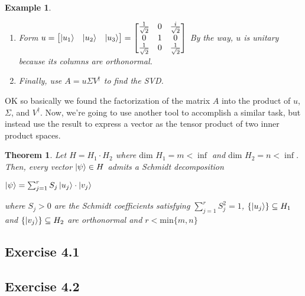 \documentclass[12pt]{article}
\theoremstyle{plain}
\newtheorem{theorem}[lemma]{Theorem}
\theoremstyle{nonumberplain}
\theoremstyle{plain}
\newtheorem{example}[lemma]{Example}
\theoremstyle{nonumberplain}
\newcommand\1{{\bf 1}}
\newcommand{\bmat}[1]{\begin{bmatrix*} #1 \end{bmatrix*}} %
\newcommand{\C}{\mathbb{C}} %
\newcommand{\<}{\left\langle}
\renewcommand{\>}{\right\rangle}
\begin{document}
\begin{example}
\begin{enumerate}
\begin{enumerate}
Ok now we have some wacky new vectors which form an orthonormal basis for $\C^3$.
\end{enumerate}
\item Form $u=\bmat{\ket{u_1} & \ket{u_2} & \ket{u_3}}=
\bmat{
\frac{1}{\sqrt{2}} & 0 & \frac{i}{\sqrt{2}} \\
0 & 1 & 0 \\
\frac{1}{\sqrt{2}} & 0 & \frac{1}{\sqrt{2}}}$ By the way, $u$ is unitary because its columns are orthonormal.
\item Finally, use $A=u\Sigma V^\dagger$ to find the SVD.
\end{enumerate}
\end{example}
OK so basically we found the factorization of the matrix $A$ into the product of $u$,$\Sigma$, and $V^\dagger$. Now, we're going to use another tool to accomplish a similar task, but instead use the result to express a vector as the tensor product of two inner product spaces.
\begin{theorem}
Let $H=H_1\cdot H_2$ where $\text{dim } H_1=m<\inf$ and $\text{dim } H_2=n<\inf$. Then, every vector $\ket{\psi}\in H$ admits a Schmidt decomposition
\begin{center}
$\ket{\psi}=\sum^r_{j=1}S_j \ket{u_j}\cdot\ket{v_j}$
\end{center}
where $S_j>0$ are the Schmidt coefficients satisfying $\sum^r_{j=1}S_j^2=1$, $\lbrace\ket{u_j}\rbrace\subseteq H_1$ and $\lbrace\ket{v_j}\rbrace\subseteq H_2$ are orthonormal and $r<\text{min}\lbrace m,n\rbrace$
\end{theorem}


\subsection{Exercise 4.1}


\subsection{Exercise 4.2}

\end{document}
